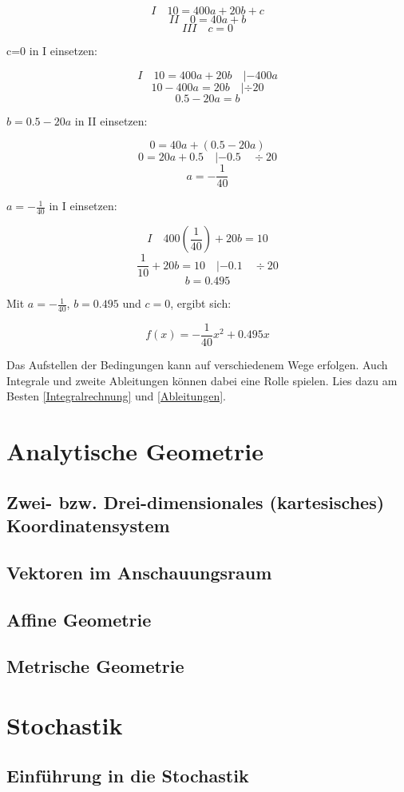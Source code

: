 \documentclass{article}
\begin{document}
			\[ I \quad 10=400a+20b+c \]
			\[ II \quad 0=40a+b \]
			\[ III \quad c=0 \]
			
			c=0 in I einsetzen:
			
			\[I \quad 10=400a+20b \quad |-400a \]
			\[ 10-400a=20b \quad | \div 20\]
			\[ 0.5-20a=b\]
			
			$b= 0.5-20a $ in II einsetzen:
			
			\[ 0=40a+(0.5-20a)\]
			\[ 0=20a+0.5 \quad |-0.5 \quad \div 20\]
			\[ a=-\frac{1}{40} \]
			
			$a=-\frac{1}{40}$ in I einsetzen:
			
			\[ I \quad 400(\frac{1}{40})+20b=10 \]
			\[ \frac{1}{10}+20b=10 \quad |-0.1 \quad \div 20\]
			\[ b=0.495\]
			
			Mit $a=-\frac{1}{40}$, $b=0.495$ und $c=0$, ergibt sich:
			
			\[f(x)=-\frac{1}{40}x^2+0.495x\]
			
			Das Aufstellen der Bedingungen kann auf verschiedenem Wege erfolgen. Auch Integrale und zweite Ableitungen können dabei eine Rolle spielen.
			Lies dazu am Besten \ref{Integralrechnung} und \ref{Ableitungen}.
		
\section{Analytische Geometrie}
	\subsection{Zwei- bzw. Drei-dimensionales (kartesisches) Koordinatensystem}
	\subsection{Vektoren im Anschauungsraum}
	\subsection{Affine Geometrie}
	\subsection{Metrische Geometrie}

\section{Stochastik}
	\subsection{Einführung in die Stochastik}
\end{document}
